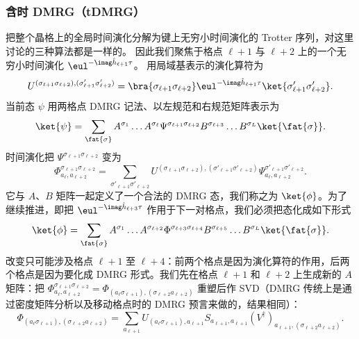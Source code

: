 \subsubsection{含时 DMRG（tDMRG）}
把整个晶格上的全局时间演化分解为键上无穷小时间演化的 Trotter 序列，对这里讨论的三种算法都是一样的。
因此我们聚焦于格点 $\ell+1$ 与 $\ell+2$ 上的一个无穷小时间演化 $\eul^{-\imag  \hat{h}_{\ell+1} \tau}$。 
用局域基表示的演化算符为
\begin{equation}
U^{(\sigma_{\ell+1} \sigma_{\ell+2}), (\sigma'_{\ell+1} \sigma'_{\ell+2})} = \bra{\sigma_{\ell+1} \sigma_{\ell+2}} \eul^{-\imag  \hat{h}_{\ell+1} \tau} \ket{\sigma'_{\ell+1} \sigma'_{\ell+2}} .
\end{equation}
当前态 $\psi$ 用两格点 DMRG 记法、以左规范和右规范矩阵表示为
\begin{equation}
\ket{\psi} = \sum_{\fat{\sigma}} A^{\sigma_1} \ldots A^{\sigma_\ell} \Psi^{\sigma_{\ell+1}\sigma_{\ell+2}} B^{\sigma_{\ell+3}} \ldots B^{\sigma_L} \ket{\fat{\sigma}} .
\end{equation}
时间演化把 $\Psi^{\sigma_{\ell+1}\sigma_{\ell+2}}$ 变为
\begin{equation}
\Phi^{\sigma_{\ell+1}\sigma_{\ell+2}}_{a_\ell, a_{\ell+2}} = \sum_{\sigma'_{\ell+1} \sigma'_{\ell+2}}
U^{(\sigma_{\ell+1} \sigma_{\ell+2}), (\sigma'_{\ell+1} \sigma'_{\ell+2})}  \Psi^{\sigma'_{\ell+1}\sigma'_{\ell+2}}_{a_\ell, a_{\ell+2}} . 
\end{equation} 
它与 $A$、$B$ 矩阵一起定义了一个合法的 DMRG 态，我们称之为 $\ket{\phi}$。为了继续推进，即把 $\eul^{-\imag  \hat{h}_{\ell+3} \tau}$ 作用于下一对格点，我们必须把态化成如下形式 
\begin{equation}
\ket{\phi} = \sum_{\fat{\sigma}} A^{\sigma_1} \ldots A^{\sigma_{\ell+2}} \Phi^{\sigma_{\ell+3}\sigma_{\ell+4}} B^{\sigma_{\ell+5}} \ldots B^{\sigma_L} \ket{\fat{\sigma}} .
\end{equation}
改变只可能涉及格点 $\ell+1$ 至 $\ell+4$：前两个格点是因为演化算符的作用，后两个格点是因为要化成 DMRG 形式。我们先在格点 $\ell+1$ 和 $\ell+2$ 上生成新的 $A$ 矩阵：把 $\Phi^{\sigma_{\ell+1}\sigma_{\ell+2}}_{a_\ell, a_{\ell+2}} = \Phi_{(a_\ell \sigma_{\ell+1}), (\sigma_{\ell+2} a_{\ell+2})}$ 重塑后作 SVD（DMRG 传统上是通过密度矩阵分析以及移动格点时的 DMRG 预言来做的，结果相同）：
\begin{equation}
\Phi_{(a_\ell \sigma_{\ell+1}),(\sigma_{\ell+2} a_{\ell+2})} = \sum_{a_{\ell+1}} U_{(a_\ell \sigma_{\ell+1}),a_{\ell+1}} S_{a_{\ell+1},a_{\ell+1}} (V^\dagger)_{a_{\ell+1}, (\sigma_{\ell+2} a_{\ell+2})}.
\end{equation}
